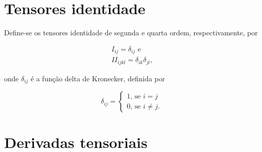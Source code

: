 \documentclass[_ArquivoPrincipal.tex]{subfiles}
\begin{document}
\section{Tensores identidade}

Define-se os tensores identidade de segunda e quarta ordem, respectivamente,
por

\begin{gather}
	I_{ij}=\delta_{ij} \text{ e} \label{eq:Id2} \\
	II_{ijkl}=\delta_{ik}\delta_{jl} \text{,}\label{eq:Id4}
\end{gather}

\noindent onde $\delta_{ij}$ é a função delta de Kronecker, definida por

\begin{equation}\label{eq:kronecker}
	\delta_{ij}=\begin{cases}
		1\text{, se } i=j \\ 0\text{, se } i\ne j \text{.}
	\end{cases}
\end{equation}

\section{Derivadas tensoriais}
\end{document}
